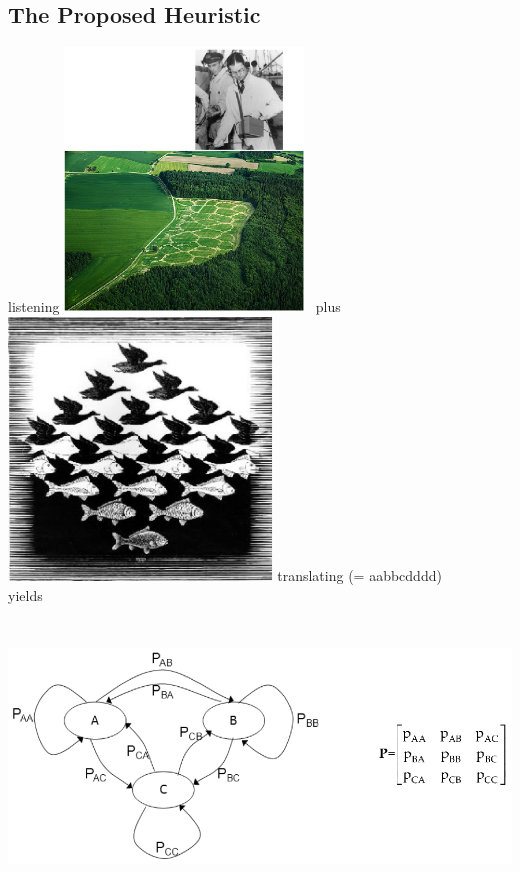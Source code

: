 \documentclass[noback]{psuposter}
\begin{document}
\subsection{The Proposed Heuristic}
listening \includegraphics[height=7cm]{figs/Image3.eps}
\ plus \ \includegraphics[height=7cm]{figs/Image4.eps} 
translating (= aabbcdddd) \\ 
yields \includegraphics[height=8cm]{figs/Image5.eps}
\vspace{-1cm}
%
%
\end{document}
